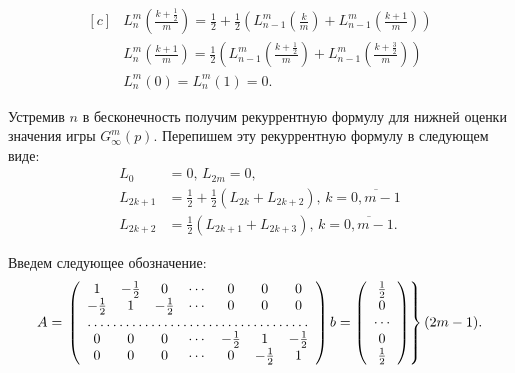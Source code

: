 \begin{equation}
\label{eq:lower_bound:recurrence_finite}
\begin{aligned}[c]
&L_n^m\left(\frac{k+\frac{1}{2}}{m}\right) = 
    \frac{1}{2} + \frac{1}{2}\left(
        L_{n-1}^m\left(\frac{k}{m}\right) + 
        L_{n-1}^m\left(\frac{k + 1}{m}\right)
    \right) \\
&L_n^m\left(\frac{k+1}{m}\right) = 
    \frac{1}{2}\left(
        L_{n-1}^m\left(\frac{k+\frac{1}{2}}{m}\right) + 
        L_{n-1}^m\left(\frac{k+\frac{3}{2}}{m}\right)
    \right) \\
&L_n^m(0) = L_n^m(1) = 0.
\end{aligned}
\end{equation}

Устремив $ n $ в бесконечность получим рекуррентную формулу для нижней оценки значения игры $ G_\infty^m(p) $. Перепишем эту рекуррентную формулу в следующем виде:
\begin{equation}
\label{eq:lower_bound:recurrence_infinite}
\begin{aligned}
L_0 &= 0,\, L_{2m} = 0, \\
L_{2k + 1} &= \frac{1}{2} + \frac{1}{2} (L_{2k} + L_{2k + 2}), \, 
    k = \overline{0,m-1}\\
L_{2k + 2} &= \frac{1}{2} (L_{2k + 1} + L_{2k + 3}), \, 
    k = \overline{0,m-1}.
\end{aligned}
\end{equation}

Введем следующее обозначение:
\begin{equation}
A = \left.
\left(\begin{array}{ccccccc}
    1 & -\frac{1}{2} & 0 & \cdots & 0 & 0 & 0 \\
    -\frac{1}{2} & 1 & -\frac{1}{2} & \cdots & 0 & 0 & 0 \\
    \hdotsfor{7} \\
    0 & 0 & 0 & \cdots & -\frac{1}{2} & 1 & -\frac{1}{2} \\
    0 & 0 & 0 & \cdots & 0 & -\frac{1}{2} & 1 \\
\end{array}\right)
b = \left(\begin{array}{c}
\frac{1}{2} \\
0\\
\cdots\\
0 \\
\frac{1}{2}
\end{array}\right)
\right\} (2m - 1).
\end{equation}


